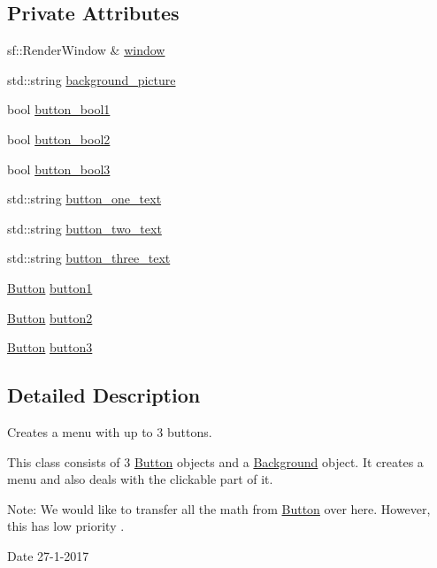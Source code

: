 \subsection*{Private Attributes}
\begin{DoxyCompactItemize}
\item 
sf\+::\+Render\+Window \& \hyperlink{classmenu_a27f2df7cf63febffe1c3c5a5e13ffb8d}{window}
\item 
std\+::string \hyperlink{classmenu_af403beeeb7beef5621f0ea806c9f3e6e}{background\+\_\+picture}
\item 
bool \hyperlink{classmenu_a044c86b2b6cd959a53f4e92caf34f7a0}{button\+\_\+bool1}
\item 
bool \hyperlink{classmenu_a043c728ce292a4d87e5e59c9c3db13b9}{button\+\_\+bool2}
\item 
bool \hyperlink{classmenu_a469661400ee077af1b949bac629d30c7}{button\+\_\+bool3}
\item 
std\+::string \hyperlink{classmenu_a460e3d024e939e6469aede94fd86a64c}{button\+\_\+one\+\_\+text}
\item 
std\+::string \hyperlink{classmenu_a027f3482fde6a4991ff4036e9e0472bd}{button\+\_\+two\+\_\+text}
\item 
std\+::string \hyperlink{classmenu_ac785c6419d139d0181e0487805657e32}{button\+\_\+three\+\_\+text}
\item 
\hyperlink{class_button}{Button} \hyperlink{classmenu_a0e51e3f8ef8fd769a42ca9a1ab3ed53e}{button1}
\item 
\hyperlink{class_button}{Button} \hyperlink{classmenu_a3292e41431ba6f6f9a1b08b94206a076}{button2}
\item 
\hyperlink{class_button}{Button} \hyperlink{classmenu_a4f19c398a6009b9d17e197c51ad19a66}{button3}
\end{DoxyCompactItemize}


\subsection{Detailed Description}
Creates a menu with up to 3 buttons. 

This class consists of 3 \hyperlink{class_button}{Button} objects and a \hyperlink{class_background}{Background} object. It creates a menu and also deals with the clickable part of it.

Note\+: We would like to transfer all the math from \hyperlink{class_button}{Button} over here. However, this has low priority .

\begin{DoxyDate}{Date}
27-\/1-\/2017 
\end{DoxyDate}


